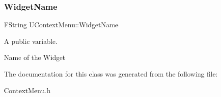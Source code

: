 \subsubsection{\texorpdfstring{Widget\+Name}{WidgetName}}
{\footnotesize\ttfamily F\+String U\+Context\+Menu\+::\+Widget\+Name}



A public variable. 

Name of the Widget 

The documentation for this class was generated from the following file\+:\begin{DoxyCompactItemize}
\item 
Context\+Menu.\+h\end{DoxyCompactItemize}
